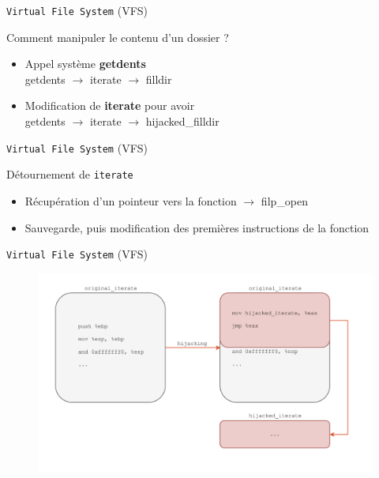 \documentclass[10pt]{beamer}
\begin{document}
	\begin{frame}{\texttt{Virtual File System} (VFS)}
		\begin{alertblock}{Comment manipuler le contenu d'un dossier ?}
	    \end{alertblock}	 
		\vspace{-0.60cm}
		\begin{itemize}
			\item Appel système \textbf{getdents}\\
			 \alert{getdents} $\rightarrow$ \alert{iterate} $\rightarrow$ \alert{filldir}
			\item Modification de \textbf{iterate} pour avoir \\
			\alert{getdents} $\rightarrow$ \alert{iterate} $\rightarrow$ \alert{hijacked\_filldir}
		\end{itemize}
	\end{frame}

	\begin{frame}{\texttt{Virtual File System} (VFS)}
		\begin{alertblock}{Détournement de \texttt{iterate}}
	    \end{alertblock}	 
		\vspace{-0.60cm}
		\begin{itemize}
			\item Récupération d'un pointeur vers la fonction $\rightarrow$ \alert{filp\_open}
			\item Sauvegarde, puis modification des premières instructions de la fonction
		\end{itemize}
	\end{frame}

	\begin{frame}{\texttt{Virtual File System} (VFS)}
		\begin{figure}
			\begin{center}
				\includegraphics[scale=0.3]{vfs_iterate_original_to_hijacked.png}
			\end{center}
		\end{figure}
	\end{frame}
\end{document}
